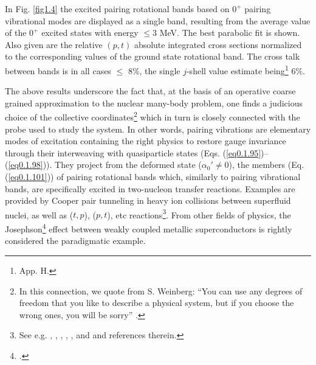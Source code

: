   
  In Fig. \ref{fig1.4} the excited pairing rotational bands based on $0^+$ pairing vibrational modes are displayed as a single band, resulting from the average  value of the $0^+$ excited states with energy $\leq$3 MeV. The best parabolic fit is shown. Also given are the relative $(p,t)$ absolute integrated cross sections normalized to the corresponding values of the ground state rotational band. The cross talk between bands is in all cases $\leq$ 8\%, the single $j$-shell value estimate being\footnote{\cite{Brink:05} App. H.} 6\%.
  
The above results underscore the fact that, at the basis of an operative coarse grained approximation to the nuclear many-body problem, one finds a judicious choice of the collective coordinates\footnote{In this connection, we quote from S. Weinberg: ``You can use any degrees of freedom that you like to describe a physical system, but if you choose the wrong ones, you will be sorry'' \citep{Weinberg:83}.} which in turn is closely connected with the probe used to study the system. In other words, pairing vibrations are elementary modes of excitation containing the right physics to restore gauge invariance through their interweaving with  quasiparticle states (Eqs. (\ref{eq0.1.95})--(\ref{eq0.1.98})). They project from the deformed state ($\alpha_0'\neq0$), the members (Eq. (\ref{eq0.1.101})) of pairing rotational bands which, similarly to pairing vibrational bands, are specifically excited in two-nucleon transfer reactions. Examples are provided by Cooper pair tunneling in heavy ion collisions between superfluid nuclei, as well as ($t,p$), ($p,t$), etc reactions\footnote{See e.g. \cite{Yoshida:62}, \cite{Glendenning:65}, \cite{Bohr:64}, \cite{Bayman:71},  \cite{Broglia:73},  \cite{Hansen:12} and \cite{Potel:13} and references therein.}. From other fields of physics, the Josephson\footnote{\cite{Josephson:62}.} effect between weakly coupled metallic superconductors 
 is rightly considered the paradigmatic example.  
